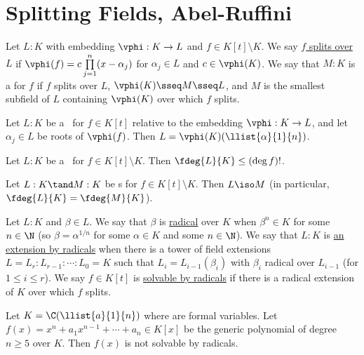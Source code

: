\documentclass[a4paper]{article}
\begin{document}
\section{Splitting Fields, Abel-Ruffini}
\begin{tdefinition}
  Let \( L:K \) with embedding \( \vphi:K\to L \) and \( f\in K[t]\setminus K \).
  We say \ul{\( f \) splits over \( L \)} if \( \vphi(f) = c\prod\limits_{j=1}^n (x-\alpha_j) \) for \( \alpha_j \in L \) and \( c\in \vphi(K) \).
  We say that \( M:K \) is a \ul{\sfe} for \( f \) if \( f \) splits over \( L \), \( \vphi(K)\sseq M\sseq L \), and \( M \) is the smallest subfield of \( L \) containing \( \vphi(K) \) over which \( f \) splits.
\end{tdefinition}

\begin{tlemma}
  Let \( L:K \) be a \sfe~for \( f\in K[t] \) relative to the embedding \( \vphi:K\to L \), and let \( \alpha_j\in L \) be roots of \( \vphi(f) \).
  Then \( L=\vphi(K)(\llist{\alpha}{1}{n}) \).
\end{tlemma}

\begin{tlemma}
  Let \( L:K \) be a \sfe~for \( f\in K[t]\setminus K \).
  Then \( \fdeg{L}{K}\leq (\deg f)! \).
\end{tlemma}

\begin{tlemma}
  Let \( L:K \tand M:K \) be  \sfe s for \( f\in K[t]\setminus K \).
  Then \( L\iso M \) (in particular, \( \fdeg{L}{K}=\fdeg{M}{K} \)).
\end{tlemma}

\begin{tdefinition}
  Let \( L:K \) and \( \beta \in L \).
  We say that \( \beta \) is \ul{radical} over \( K \) when \( \beta^n \in K \) for some \( n \in \N \) (so \( \beta = \alpha^{1/n} \) for some \( \alpha \in K \) and some \( n \in \N \)).
  We say that \( L:K \) is \ul{an extension by radicals} when there is a tower of field extensions \( L = L_r : L_{r-1} : \cdots : L_0 = K \) such that \( L_i = L_{i-1}(\beta_i) \) with \( \beta_i \) radical over \( L_{i-1} \) (for \( 1 \leq i \leq r \)).
  We say \( f \in K[t] \) is \ul{solvable by radicals} if there is a radical extension of \( K \) over which \( f \) splits.
\end{tdefinition}

\begin{ttheorem}
  Let \( K=\C(\llist{a}{1}{n}) \) where  are formal variables.
  Let \( f(x) = x^n+a_1x^{n-1}+\cdots+a_n \in K[x] \) be the generic polynomial of degree \( n\geq 5 \) over \( K \).
  Then \( f(x) \) is not solvable by radicals.
\end{ttheorem}
\end{document}

